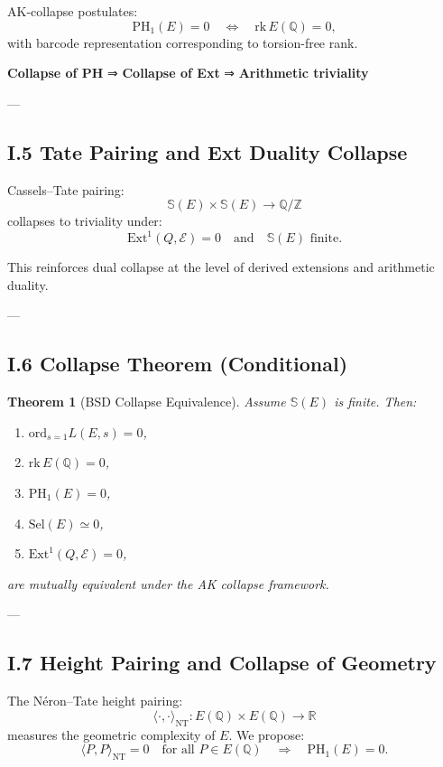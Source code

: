 \documentclass[11pt]{article}
\newcommand{\Sha}{\mathbb{S}}
\newtheorem{theorem}{Theorem}[section]
\begin{document}
AK-collapse postulates:
\[
\mathrm{PH}_1(E) = 0 \quad \Leftrightarrow \quad \mathrm{rk}\,E(\mathbb{Q}) = 0,
\]
with barcode representation corresponding to torsion-free rank.

\textbf{Collapse of PH} ⇒ \textbf{Collapse of Ext} ⇒ \textbf{Arithmetic triviality}

---

\subsection*{I.5 Tate Pairing and Ext Duality Collapse}

Cassels–Tate pairing:
\[
\Sha(E) \times \Sha(E) \to \mathbb{Q}/\mathbb{Z}
\]
collapses to triviality under:
\[
\mathrm{Ext}^1(Q, \mathcal{E}) = 0 \quad \text{and} \quad \Sha(E) \text{ finite}.
\]

This reinforces dual collapse at the level of derived extensions and arithmetic duality.

---

\subsection*{I.6 Collapse Theorem (Conditional)}

\begin{theorem}[BSD Collapse Equivalence]
Assume $\Sha(E)$ is finite. Then:
\begin{enumerate}
  \item $\mathrm{ord}_{s=1} L(E,s) = 0$,
  \item $\mathrm{rk}\,E(\mathbb{Q}) = 0$,
  \item $\mathrm{PH}_1(E) = 0$,
  \item $\mathrm{Sel}(E) \simeq 0$,
  \item $\mathrm{Ext}^1(Q, \mathcal{E}) = 0$,
\end{enumerate}
are mutually equivalent under the AK collapse framework.
\end{theorem}

---

\subsection*{I.7 Height Pairing and Collapse of Geometry}

The Néron–Tate height pairing:
\[
\langle\cdot,\cdot\rangle_{\text{NT}} : E(\mathbb{Q}) \times E(\mathbb{Q}) \to \mathbb{R}
\]
measures the geometric complexity of $E$.  
We propose:
\[
\langle P,P \rangle_{\text{NT}} = 0 \quad \text{for all } P \in E(\mathbb{Q}) \quad \Rightarrow \quad \text{PH}_1(E) = 0.
\]
\end{document}
